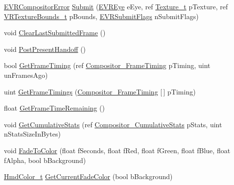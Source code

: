 \begin{DoxyCompactItemize}
\item 
\mbox{\hyperlink{namespace_valve_1_1_v_r_ac34ee1034fda668ccd45f57676ded81b}{E\+V\+R\+Compositor\+Error}} \mbox{\hyperlink{class_valve_1_1_v_r_1_1_c_v_r_compositor_a7976402c028a04424c1c8c2afc7352cf}{Submit}} (\mbox{\hyperlink{namespace_valve_1_1_v_r_a8153d4a3e627e1cede046327087c1880}{E\+V\+R\+Eye}} e\+Eye, ref \mbox{\hyperlink{struct_valve_1_1_v_r_1_1_texture__t}{Texture\+\_\+t}} p\+Texture, ref \mbox{\hyperlink{struct_valve_1_1_v_r_1_1_v_r_texture_bounds__t}{V\+R\+Texture\+Bounds\+\_\+t}} p\+Bounds, \mbox{\hyperlink{namespace_valve_1_1_v_r_ad103abad1c8abaa4b384eccf2605265f}{E\+V\+R\+Submit\+Flags}} n\+Submit\+Flags)
\item 
void \mbox{\hyperlink{class_valve_1_1_v_r_1_1_c_v_r_compositor_ad8a809c0934f27e815138b1b5b1c3ac6}{Clear\+Last\+Submitted\+Frame}} ()
\item 
void \mbox{\hyperlink{class_valve_1_1_v_r_1_1_c_v_r_compositor_af0edf4a5daeb306c684e8fce57fbb4d2}{Post\+Present\+Handoff}} ()
\item 
bool \mbox{\hyperlink{class_valve_1_1_v_r_1_1_c_v_r_compositor_a71bfd8b0a546740f5a6f5cc5bcb1e8a8}{Get\+Frame\+Timing}} (ref \mbox{\hyperlink{struct_valve_1_1_v_r_1_1_compositor___frame_timing}{Compositor\+\_\+\+Frame\+Timing}} p\+Timing, uint un\+Frames\+Ago)
\item 
uint \mbox{\hyperlink{class_valve_1_1_v_r_1_1_c_v_r_compositor_a56223c23cb5c7c73a1e312c4d38416f4}{Get\+Frame\+Timings}} (\mbox{\hyperlink{struct_valve_1_1_v_r_1_1_compositor___frame_timing}{Compositor\+\_\+\+Frame\+Timing}} \mbox{[}$\,$\mbox{]} p\+Timing)
\item 
float \mbox{\hyperlink{class_valve_1_1_v_r_1_1_c_v_r_compositor_aee1331fd25c50a38f937bcac4480bcd5}{Get\+Frame\+Time\+Remaining}} ()
\item 
void \mbox{\hyperlink{class_valve_1_1_v_r_1_1_c_v_r_compositor_a47169fba7086633b916298a44925c873}{Get\+Cumulative\+Stats}} (ref \mbox{\hyperlink{struct_valve_1_1_v_r_1_1_compositor___cumulative_stats}{Compositor\+\_\+\+Cumulative\+Stats}} p\+Stats, uint n\+Stats\+Size\+In\+Bytes)
\item 
void \mbox{\hyperlink{class_valve_1_1_v_r_1_1_c_v_r_compositor_a3fbfe2e11f720a212192694e79d3171e}{Fade\+To\+Color}} (float f\+Seconds, float f\+Red, float f\+Green, float f\+Blue, float f\+Alpha, bool b\+Background)
\item 
\mbox{\hyperlink{struct_valve_1_1_v_r_1_1_hmd_color__t}{Hmd\+Color\+\_\+t}} \mbox{\hyperlink{class_valve_1_1_v_r_1_1_c_v_r_compositor_af73cb9a5be70dc579ba8f08200c8e602}{Get\+Current\+Fade\+Color}} (bool b\+Background)

\end{DoxyCompactItemize}
